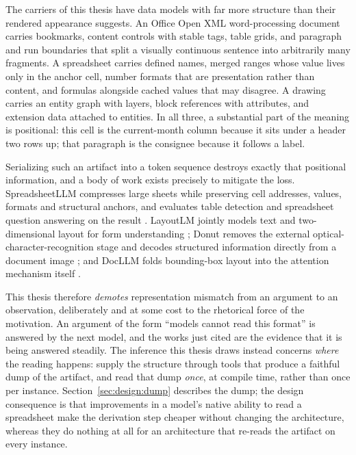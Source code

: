 The carriers of this thesis have data models with far more structure than their rendered
appearance suggests. An Office Open XML word-processing document carries bookmarks, content
controls with stable tags, table grids, and paragraph and run boundaries that split a visually
continuous sentence into arbitrarily many fragments. A spreadsheet carries defined names,
merged ranges whose value lives only in the anchor cell, number formats that are presentation
rather than content, and formulas alongside cached values that may disagree. A drawing carries
an entity graph with layers, block references with attributes, and extension data attached to
entities. In all three, a substantial part of the meaning is positional: this cell is the
current-month column because it sits under a header two rows up; that paragraph is the
consignee because it follows a label.

Serializing such an artifact into a token sequence destroys exactly that positional
information, and a body of work exists precisely to mitigate the loss. SpreadsheetLLM
compresses large sheets while preserving cell addresses, values, formats and structural
anchors, and evaluates table detection and spreadsheet question answering on the result
\cite{dong2024spreadsheetllm}. LayoutLM jointly models text and two-dimensional layout for form
understanding \cite{xu2020layoutlm}; Donut removes the external optical-character-recognition
stage and decodes structured information directly from a document image \cite{kim2022donut}; and
DocLLM folds bounding-box layout into the attention mechanism itself
\cite{wang2024docllm}.

This thesis therefore \emph{demotes} representation mismatch from an argument to an
observation, deliberately and at some cost to the rhetorical force of the motivation. An
argument of the form ``models cannot read this format'' is answered by the next model, and the
works just cited are the evidence that it is being answered steadily. The inference this thesis
draws instead concerns \emph{where} the reading happens: supply the structure through tools
that produce a faithful dump of the artifact, and read that dump \emph{once}, at compile time,
rather than once per instance. Section~\ref{sec:design:dump} describes the dump; the design
consequence is that improvements in a model's native ability to read a spreadsheet make the
derivation step cheaper without changing the architecture, whereas they do nothing at all for
an architecture that re-reads the artifact on every instance.

